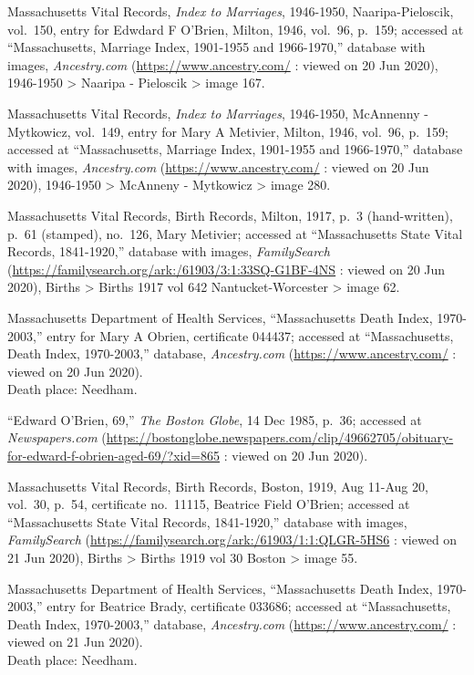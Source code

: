 \begin{thebibliography}{999}
	Massachusetts Vital Records, \textit{Index to Marriages}, 1946-1950, Naaripa-Pieloscik, vol.\ 150, entry for Edwdard F O'Brien, Milton, 1946, vol.\ 96, p.\ 159; accessed at ``Massachusetts, Marriage Index, 1901-1955 and 1966-1970,'' database with images, \textit{Ancestry.com} (\url{https://www.ancestry.com/} : viewed on 20 Jun 2020), 1946-1950 > Naaripa - Pieloscik > image 167.
	
	Massachusetts Vital Records, \textit{Index to Marriages}, 1946-1950, McAnnenny - Mytkowicz, vol.\ 149, entry for Mary A Metivier, Milton, 1946, vol.\ 96, p.\ 159; accessed at ``Massachusetts, Marriage Index, 1901-1955 and 1966-1970,'' database with images, \textit{Ancestry.com} (\url{https://www.ancestry.com/} : viewed on 20 Jun 2020), 1946-1950 > McAnneny - Mytkowicz > image 280.
	
	Massachusetts Vital Records, Birth Records, Milton, 1917, p.\ 3 (hand-written), p.\ 61 (stamped), no.\ 126, Mary Metivier; accessed at ``Massachusetts State Vital Records, 1841-1920,'' database with images, \textit{FamilySearch} (\url{https://familysearch.org/ark:/61903/3:1:33SQ-G1BF-4NS} : viewed on 20 Jun 2020), Births > Births 1917 vol 642 Nantucket-Worcester > image 62.
	
	Massachusetts Department of Health Services, ``Massachusetts Death Index, 1970-2003,'' entry for Mary A Obrien, certificate 044437; accessed at ``Massachusetts, Death Index, 1970-2003,'' database, \textit{Ancestry.com} (\url{https://www.ancestry.com/} : viewed on 20 Jun 2020).\\
	Death place: Needham.
	
	``Edward O'Brien, 69,'' \textit{The Boston Globe}, 14 Dec 1985, p.\ 36; accessed at \textit{Newspapers.com} (\url{https://bostonglobe.newspapers.com/clip/49662705/obituary-for-edward-f-obrien-aged-69/?xid=865} : viewed on 20 Jun 2020).
	
	Massachusetts Vital Records, Birth Records, Boston, 1919, Aug 11-Aug 20, vol.\ 30, p.\ 54, certificate no.\ 11115, Beatrice Field O'Brien; accessed at ``Massachusetts State Vital Records, 1841-1920,'' database with images, \textit{FamilySearch} (\url{https://familysearch.org/ark:/61903/1:1:QLGR-5HS6} : viewed on 21 Jun 2020), Births > Births 1919 vol 30 Boston > image 55.
	
	Massachusetts Department of Health Services, ``Massachusetts Death Index, 1970-2003,'' entry for Beatrice Brady, certificate 033686; accessed at ``Massachusetts, Death Index, 1970-2003,'' database, \textit{Ancestry.com} (\url{https://www.ancestry.com/} : viewed on 21 Jun 2020).\\
	Death place: Needham.
	

\end{thebibliography}
